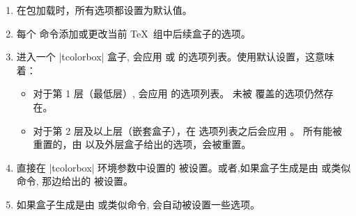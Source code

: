 \begin{enumerate}
  \item %
  在包加载时，所有选项都设置为默认值。
  \item %
  每个  命令添加或更改当前 \TeX\ 组中后续盒子的选项。
  \item 
  
  进入一个 |tcolorbox| 盒子, 会应用  或   的选项列表。使用默认设置，这意味着：
    \begin{itemize}
    \item %
  对于第 1 层（最低层）, 会应用  的选项列表。%
  未被  覆盖的选项仍然存在。
    \item 
    对于第 2 层及以上层（嵌套盒子），在  选项列表之后会应用 。 所有能被重置的，由  以及外层盒子给出的选项，会被重置。
    \end{itemize}
  \item 
  直接在 |tcolorbox| 环境参数中设置的  被设置。或者,如果盒子生成是由  或类似命令, 那边给出的  被设置。
  \item 
  如果盒子生成是由  或类似命令, 会自动被设置一些选项。
  \end{enumerate}
  
